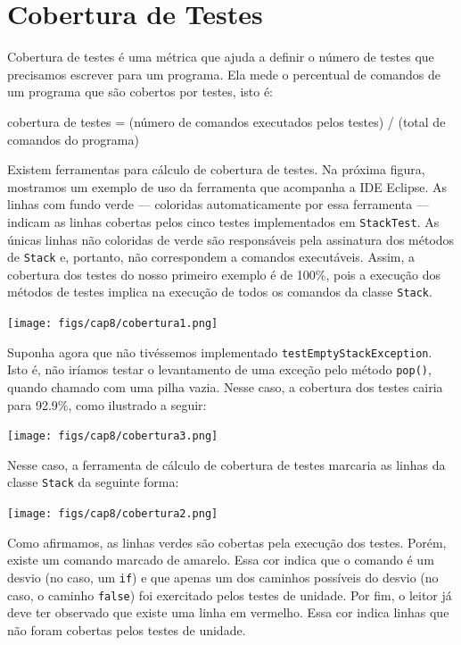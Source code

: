 \documentclass[
  11pt,
  twoside]{book}
\newcommand{\passthrough}[1]{#1}
\renewenvironment{quote}{\centering \vspace{1.5ex} \begin{tcolorbox}[colback=backcolor, width=4.9in]}{\end{tcolorbox}}
\begin{document}
\hypertarget{cobertura-de-testes}{%
\section{Cobertura de Testes}\label{cobertura-de-testes}}

 

 Cobertura de testes é uma métrica
que ajuda a definir o número de testes que precisamos escrever para um
programa. Ela mede o percentual de comandos de um programa que são
cobertos por testes, isto é:

\begin{quote}
cobertura de testes = (número de comandos executados pelos testes) /
(total de comandos do programa)
\end{quote}

Existem ferramentas para cálculo de cobertura de testes. Na próxima
figura, mostramos um exemplo de uso da ferramenta que acompanha a IDE
Eclipse. As linhas com fundo verde --- coloridas automaticamente por
essa ferramenta --- indicam as linhas cobertas pelos cinco testes
implementados em \passthrough{\lstinline!StackTest!}. As únicas linhas
não coloridas de verde são responsáveis pela assinatura dos métodos de
\passthrough{\lstinline!Stack!} e, portanto, não correspondem a comandos
executáveis. Assim, a cobertura dos testes do nosso primeiro exemplo é
de 100\%, pois a execução dos métodos de testes implica na execução de
todos os comandos da classe \passthrough{\lstinline!Stack!}.

\texttt{[image: figs/cap8/cobertura1.png]}

Suponha agora que não tivéssemos implementado
\passthrough{\lstinline!testEmptyStackException!}. Isto é, não iríamos
testar o levantamento de uma exceção pelo método
\passthrough{\lstinline!pop()!}, quando chamado com uma pilha vazia.
Nesse caso, a cobertura dos testes cairia para 92.9\%, como ilustrado a
seguir:

\texttt{[image: figs/cap8/cobertura3.png]}

Nesse caso, a ferramenta de cálculo de cobertura de testes marcaria as
linhas da classe \passthrough{\lstinline!Stack!} da seguinte forma:

\texttt{[image: figs/cap8/cobertura2.png]}

Como afirmamos, as linhas verdes são cobertas pela execução dos testes.
Porém, existe um comando marcado de amarelo. Essa cor indica que o
comando é um desvio (no caso, um \passthrough{\lstinline!if!}) e que
apenas um dos caminhos possíveis do desvio (no caso, o caminho
\passthrough{\lstinline!false!}) foi exercitado pelos testes de unidade.
Por fim, o leitor já deve ter observado que existe uma linha em
vermelho. Essa cor indica linhas que não foram cobertas pelos testes de
unidade.
\end{document}
